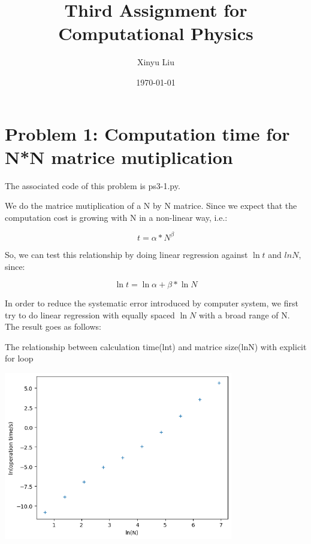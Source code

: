 \documentclass[letterpaper,12pt]{article}
\title{Third Assignment for Computational Physics}
\date{\today}
\author{Xinyu Liu}
\begin{document}
\maketitle
\tableofcontents

\section{Problem 1: Computation time for N*N matrice mutiplication}

The associated code of this problem is ps3-1.py.

We do the matrice mutiplication of a N by N matrice. Since we expect that the computation cost is growing with N in a non-linear way, i.e.:

\begin{equation}
    t = \alpha * N^{\beta}
\end{equation}

So, we can test this relationship by doing linear regression against $\ln{t}$ and $ln{N}$, since:

\begin{equation}
    \ln{t} = \ln{\alpha} + \beta * \ln{N}
\end{equation}

In order to reduce the systematic error introduced by computer system, we first try to do linear regression with equally spaced $\ln{N}$ with a broad range of N. The result goes as follows:

\begin{table}[!h]
    \centering
    \caption{The relationship between calculation time(lnt) and matrice size(lnN) with explicit for loop}
    \includegraphics[width=10cm]{ps3-11.png}
    \label{plot}%
\end{table}%
\end{document}
